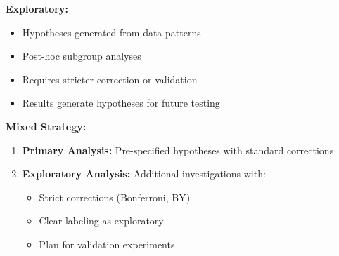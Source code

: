 \textbf{Exploratory:}

\begin{itemize}
    \item Hypotheses generated from data patterns
    \item Post-hoc subgroup analyses
    \item Requires stricter correction or validation
    \item Results generate hypotheses for future testing
\end{itemize}

\textbf{Mixed Strategy:}

\begin{enumerate}
    \item \textbf{Primary Analysis:} Pre-specified hypotheses with standard corrections

    \item \textbf{Exploratory Analysis:} Additional investigations with:
    \begin{itemize}
        \item Strict corrections (Bonferroni, BY)
        \item Clear labeling as exploratory
        \item Plan for validation experiments
    \end{itemize}
\end{enumerate}

